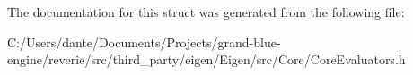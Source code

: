 The documentation for this struct was generated from the following file\+:\begin{DoxyCompactItemize}
\item 
C\+:/\+Users/dante/\+Documents/\+Projects/grand-\/blue-\/engine/reverie/src/third\+\_\+party/eigen/\+Eigen/src/\+Core/Core\+Evaluators.\+h\end{DoxyCompactItemize}
